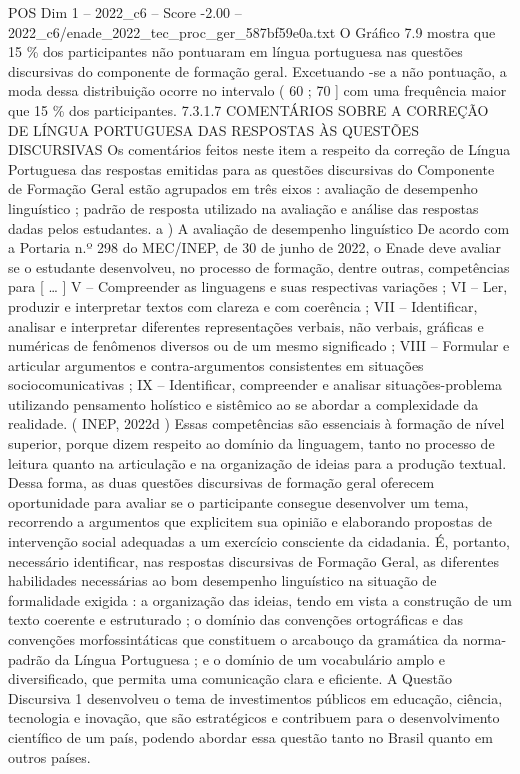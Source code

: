 \begin{textsample}{POS Dim 1 – 2022\_c6 – Score -2.00 – 2022\_c6/enade\_2022\_tec\_proc\_ger\_587bf59e0a.txt}
O Gráfico 7.9 mostra que 15 \% dos participantes não pontuaram em língua portuguesa nas questões discursivas do componente de formação geral.
Excetuando -se a não pontuação, a moda dessa distribuição ocorre no intervalo ( 60 ; 70 ] com uma frequência maior que 15 \% dos participantes. 7.3.1.7 COMENTÁRIOS SOBRE A CORREÇÃO DE LÍNGUA PORTUGUESA DAS RESPOSTAS ÀS QUESTÕES DISCURSIVAS Os comentários feitos neste item a respeito da correção de Língua Portuguesa das respostas emitidas para as questões discursivas do Componente de Formação Geral estão agrupados em três eixos : avaliação de desempenho linguístico ; padrão de resposta utilizado na avaliação e análise das respostas dadas pelos estudantes. a ) A avaliação de desempenho linguístico De acordo com a Portaria n.º 298 do MEC/INEP, de 30 de junho de 2022, o Enade deve avaliar se o estudante desenvolveu, no processo de formação, dentre outras, competências para [ … ] V – Compreender as linguagens e suas respectivas variações ; VI – Ler, produzir e interpretar textos com clareza e com coerência ; VII – Identificar, analisar e interpretar diferentes representações verbais, não verbais, gráficas e numéricas de fenômenos diversos ou de um mesmo significado ; VIII – Formular e articular argumentos e contra-argumentos consistentes em situações sociocomunicativas ; IX – Identificar, compreender e analisar situações-problema utilizando pensamento holístico e sistêmico ao se abordar a complexidade da realidade. ( INEP, 2022d ) Essas competências são essenciais à formação de nível superior, porque dizem respeito ao domínio da linguagem, tanto no processo de leitura quanto na articulação e na organização de ideias para a produção textual.
Dessa forma, as duas questões discursivas de formação geral oferecem oportunidade para avaliar se o participante consegue desenvolver um tema, recorrendo a argumentos que explicitem sua opinião e elaborando propostas de intervenção social adequadas a um exercício consciente da cidadania.
É, portanto, necessário identificar, nas respostas discursivas de Formação Geral, as diferentes habilidades necessárias ao bom desempenho linguístico na situação de formalidade exigida : a organização das ideias, tendo em vista a construção de um texto coerente e estruturado ; o domínio das convenções ortográficas e das convenções morfossintáticas que constituem o arcabouço da gramática da norma-padrão da Língua Portuguesa ; e o domínio de um vocabulário amplo e diversificado, que permita uma comunicação clara e eficiente.
A Questão Discursiva 1 desenvolveu o tema de investimentos públicos em educação, ciência, tecnologia e inovação, que são estratégicos e contribuem para o desenvolvimento científico de um país, podendo abordar essa questão tanto no Brasil quanto em outros países.

\end{textsample}
